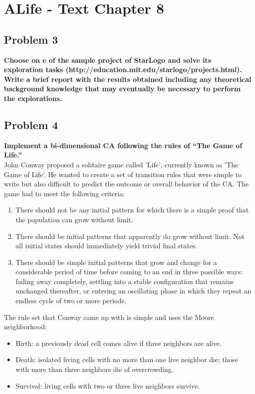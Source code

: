 
\chapter{ALife - Text Chapter 8}

\section{ Problem 3 }
\textbf{ Choose on e of the sample project of StarLogo and solve its exploration tasks (http://education.mit.edu/starlogo/projects.html). Write a brief report with the results obtained including any theoretical background knowledge that may eventually be necessary to perform the explorations. } 

\section{ Problem 4 }
\textbf{ Implement a bi-dimensional CA following the rules of ``The Game of Life.'' }\\
\newline
John Conway proposed a solitaire game called 'Life', currently known as 'The Game of Life'. He wanted to create a set of transition rules that were simple to write but also difficult to predict the outcome or overall behavior of the CA. The game had to meet the following criteria:
\begin{enumerate}
\item There should not be any initial pattern for which there is a simple proof that the population can grow without limit.
\item There should be initial patterns that apparently do grow without limit. Not all initial states should immediately yield trivial final states.
\item There should be simple initial patterns that grow and change for a considerable period of time before coming to an end in three possible ways: fading away completely, settling into a stable configuration that remains unchanged thereafter, or entering an oscillating phase in which they repeat an endless cycle of two or more periods.
\end{enumerate}

The rule set that Conway came up with is simple and uses the Moore neighborhood:
\begin{itemize}
    \item Birth: a previously dead cell comes alive if three neighbors are alive.
    \item Death: isolated living cells with no more than one live neighbor die; those with more than three neighbors die of overcrowding.
    \item Survival: living cells with two or three live neighbors survive.
\end{itemize}

